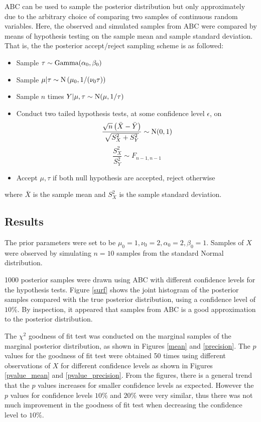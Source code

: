 \documentclass[a4paper]{proc}
\begin{document}
ABC can be used to sample the posterior distribution but only approximately due to the arbitrary choice of comparing two samples of continuous random variables. Here, the observed and simulated samples from ABC were compared by means of hypothesis testing on the sample mean and sample standard deviation. That is, the the posterior accept/reject sampling scheme is as followed:
\begin{itemize}
	\item Sample $\tau\sim\textup{Gamma}(\alpha_0,\beta_0)$
	\item Sample $\mu|\tau\sim\textup{N}\left(\mu_0,1/(\nu_0\tau)\right)$
	\item Sample $n$ times $Y|\mu,\tau\sim\textup{N}(\mu,1/\tau)$
	\item Conduct two tailed hypothesis tests, at some confidence level $\epsilon$, on
	\begin{equation}
	\dfrac{\sqrt{n}\left(\bar{X}-\bar{Y}\right)}{\sqrt{S_X^2+S_Y^2}}\sim\textup{N}(0,1)
	\end{equation}
	\begin{equation}
	\dfrac{S_X^2}{S_Y^2}\sim F_{n-1,n-1}
	\end{equation}
	\item Accept $\mu,\tau$ if both null hypothesis are accepted, reject otherwise
\end{itemize}
where $\bar{X}$ is the sample mean and $S_X^2$ is the sample standard deviation.

\subsection{Results}
The prior parameters were set to be $\mu_0=1,\nu_0=2,\alpha_0=2,\beta_0=1$. Samples of $X$ were observed by simulating $n=10$ samples from the standard Normal distribution.

1000 posterior samples were drawn using ABC with different confidence levels for the hypothesis tests. Figure \ref{surf} shows the joint histogram of the posterior samples compared with the true posterior distribution, using a confidence level of $10\%$. By inspection, it appeared that samples from ABC is a good approximation to the posterior distribution.

The $\chi^2$ goodness of fit test was conducted on the marginal samples of the marginal posterior distribution, as shown in Figures \ref{mean} and \ref{precision}. The $p$ values for the goodness of fit test were obtained 50 times using different observations of $X$ for different confidence levels as shown in Figures \ref{pvalue_mean} and \ref{pvalue_precision}. From the figures, there is a general trend that the $p$ values increases for smaller confidence levels as expected. However the $p$ values for confidence levels $10\%$ and $20\%$ were very similar, thus there was not much improvement in the goodness of fit test when decreasing the confidence level to $10\%.$
\end{document}
